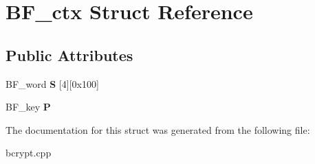 \hypertarget{structBF__ctx}{}\section{B\+F\+\_\+ctx Struct Reference}
\label{structBF__ctx}
\subsection*{Public Attributes}
\begin{DoxyCompactItemize}
\item 
\hypertarget{structBF__ctx_ae16879b199664e199cacb4fe5d43d94b}{}B\+F\+\_\+word {\bfseries S} \mbox{[}4\mbox{]}\mbox{[}0x100\mbox{]}\label{structBF__ctx_ae16879b199664e199cacb4fe5d43d94b}

\item 
\hypertarget{structBF__ctx_a54b05caa5443c19de34d210ec7b13120}{}B\+F\+\_\+key {\bfseries P}\label{structBF__ctx_a54b05caa5443c19de34d210ec7b13120}

\end{DoxyCompactItemize}


The documentation for this struct was generated from the following file\+:\begin{DoxyCompactItemize}
\item 
bcrypt.\+cpp\end{DoxyCompactItemize}
